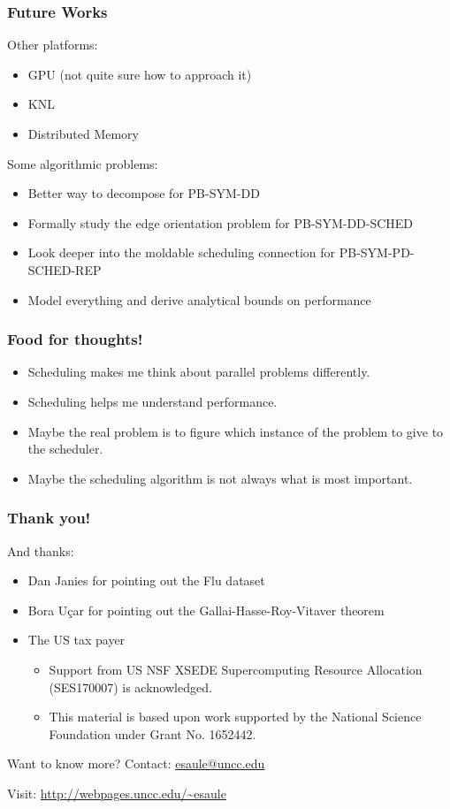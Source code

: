 \documentclass{beamer}
\begin{document}
\begin{frame}
  \frametitle{Future Works}

  Other platforms:
  \begin{itemize}
  \item GPU (not quite sure how to approach it)
  \item KNL
  \item Distributed Memory
  \end{itemize}

  Some algorithmic problems:
  \begin{itemize}
  \item Better way to decompose for \textsc{PB-SYM-DD}
  \item Formally study the edge orientation problem for \textsc{PB-SYM-DD-SCHED}
  \item Look deeper into the moldable scheduling connection for \textsc{PB-SYM-PD-SCHED-REP}
  \item Model everything and derive analytical bounds on performance
  \end{itemize}
\end{frame}

\begin{frame}
  \frametitle{Food for thoughts!}

  \begin{itemize}
  \item Scheduling makes me think about parallel problems differently.
  \item Scheduling helps me understand performance.
  \item Maybe the real problem is to figure which instance of the
    problem to give to the scheduler.
  \item Maybe the scheduling algorithm is not always what is most
    important.
  \end{itemize}
\end{frame}

\begin{frame}
  \frametitle{Thank you!}

  And thanks:
  \begin{itemize}
  \item Dan Janies for pointing out the Flu dataset
  \item Bora U\c{c}ar for pointing out the Gallai-Hasse-Roy-Vitaver theorem
  \item The US tax payer
    \begin{itemize}
    \item Support from US NSF XSEDE Supercomputing Resource Allocation (SES170007) is acknowledged.
    \item This material is based upon work supported by the National Science Foundation under Grant No. 1652442.
    \end{itemize}
  \end{itemize}

  \begin{block}{Want to know more?}
    Contact: \url{esaule@uncc.edu}

    Visit: \url{http://webpages.uncc.edu/~esaule}
  \end{block}
\end{frame}



\end{document}
